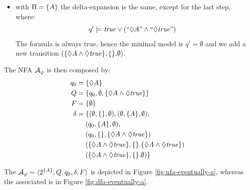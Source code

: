 \begin{example}
\begin{enumerate}
\begin{itemize}
			\item with $\Pi = \{A\}$ the delta-expansion is the same, except for the last step, where:
			\[
			q' \models \mathit{true} \vee ( ``\Diamond A" \wedge ``\Diamond \mathit{true}")\
			\]
			The formula is always true, hence the minimal model is $q'=\emptyset$ and we add a new transition $(\{\Diamond A \wedge \Diamond \mathit{true}\}, \{\}. \emptyset)$. 
			
		\end{itemize}
	
	The NFA $\mathcal{A}_\varphi$ is then composed by:
	\begin{align*}
	q_0 &= \{\Diamond A\}		\\
	Q &= \{q_0, \emptyset, \{\Diamond A \wedge \Diamond \mathit{true}\}\}  \\
	F &= \{\emptyset\}  \\
	\delta &= \{(\emptyset, \{\}, \emptyset), (\emptyset, \{A\}, \emptyset),\\
		&\hspace*{.18in} (q_0, \{A\}, \emptyset),\\
		&\hspace*{.18in} (q_0, \{\}, \{\Diamond A \wedge \Diamond \mathit{true}\})\\
		&\hspace*{.18in} (\{\Diamond A \wedge \Diamond \mathit{true}\}, \{\}. \{\Diamond A \wedge \Diamond \mathit{true}\})\\
		&\hspace*{.18in} (\{\Diamond A \wedge \Diamond \mathit{true}\}, \{\}. \emptyset)\}
	\end{align*}
	\end{enumerate}
	
	The \NFA $\mathcal{A}_\varphi = \langle 2^{\{A\}}, Q, q_0, \delta, F \rangle$ is depicted in Figure \ref{fig:nfa-eventually-a}, whereas the associated \DFA is in Figure \ref{fig:dfa-eventually-a}.
	

\end{example}
